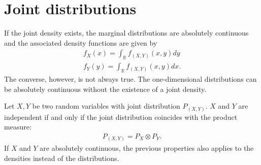 \section{Joint distributions}


    \begin{result}
        If the joint density exists, the marginal distributions are absolutely continuous and the associated density functions are given by
        \begin{gather}
            f_X(x) = \int_\mathbb{R}f_{(X,Y)}(x,y)dy\\
            f_Y(y) = \int_\mathbb{R}f_{(X,Y)}(x,y)dx.
        \end{gather}
        The converse, however, is not always true. The one-dimensional distributions can be absolutely continuous without the existence of a joint density.
    \end{result}

    \begin{property}[Independence]\label{prob:independent_densities}
        Let $X,Y$ be two random variables with joint distribution $P_{(X,Y)}$. $X$ and $Y$ are independent if and only if the joint distribution coincides with the product measure:
        \begin{gather}
            P_{(X,Y)} = P_X\otimes P_Y.
        \end{gather}
        If $X$ and $Y$ are absolutely continuous, the previous properties also applies to the densities instead of the distributions.
    \end{property}

